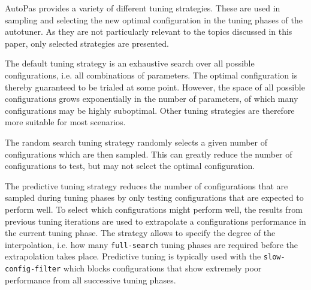 AutoPas provides a variety of different tuning strategies. These are used in sampling and selecting the new optimal configuration in the tuning phases of the autotuner. As they are not particularly relevant to the topics discussed in this paper, only selected strategies are presented.
\begin{description}[leftmargin=!,labelwidth=\widthof{\textbf{PredictiveTuning }}]
	\item[\textbf{FullSearch}] The default tuning strategy is an exhaustive search over all possible configurations, i.e. all combinations of parameters. The optimal configuration is thereby guaranteed to be trialed at some point. However, the space of all possible configurations grows exponentially in the number of parameters, of which many configurations may be highly suboptimal. Other tuning strategies are therefore more suitable for most scenarios.
	\item[\textbf{RandomSearch}] The random search tuning strategy randomly selects a given number of configurations which are then sampled. This can greatly reduce the number of configurations to test, but may not select the optimal configuration.
	\item[\textbf{PredictiveTuning}] The predictive tuning strategy reduces the number of configurations that are sampled during tuning phases by only testing configurations that are expected to perform well. To select which configurations might perform well, the results from previous tuning iterations are used to extrapolate a configurations performance in the current tuning phase. The strategy allows to specify the degree of the interpolation, i.e. how many \texttt{full-search} tuning phases are required before the extrapolation takes place. Predictive tuning is typically used with the \texttt{slow-config-filter} which blocks configurations that show extremely poor performance from all successive tuning phases. \cite{Pelloth2020}
\end{description}


